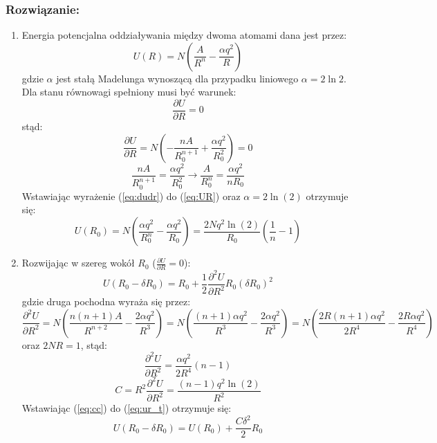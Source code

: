 \subsubsection*{Rozwiązanie:}
\begin{enumerate}
\item Energia potencjalna oddziaływania między dwoma atomami dana jest przez:
\begin{equation}
\label{eq:UR}
U(R) = N\left( \frac{A}{R^n} - \frac{\alpha q^2}{R} \right)
\end{equation}
gdzie $\alpha$ jest stałą Madelunga wynoszącą dla przypadku liniowego $\alpha = 2\ln 2$.\\
Dla stanu równowagi spełniony musi być warunek:
\begin{equation}
\frac{\partial U}{\partial R} = 0
\end{equation}
stąd:
\begin{equation}
\frac{\partial U}{\partial R} = N \left( -\frac{nA}{R_0^{n+1}} + \frac{\alpha q^2}{R_0^2} \right)= 0
\end{equation}
\begin{equation}
\label{eq:dudr}
\frac{nA}{R_0^{n+1}} = \frac{\alpha q^2}{R_0^2} \rightarrow \frac{A}{R_0^n} = \frac{\alpha q^2}{n R_0}
\end{equation}
Wstawiając wyrażenie (\ref{eq:dudr}) do (\ref{eq:UR}) oraz $\alpha=2\ln(2)$ otrzymuje się:
\begin{equation}
U(R_0) = N \left( \frac{\alpha q^2}{R_0^n} - \frac{\alpha q^2}{R_0} \right) = \frac{2Nq^2\ln(2)}{R_0} \left( \frac{1}{n} -1 \right)
\end{equation}
\hrulefill
\item Rozwijając w szereg wokół $R_0$ ($\frac{\partial U}{\partial R} =0 $):
\begin{equation}
\label{eq:ur_t}
U(R_0-\delta R_0 ) = R_0 + \frac{1}{2} \frac{\partial^2 U}{\partial R^2} R_0 (\delta R_0)^2
\end{equation}
gdzie druga pochodna wyraża się przez:
\begin{equation}
\frac{\partial^2 U}{\partial R^2} = N \left( \frac{n(n+1)A}{R^{n+2}} - \frac{2\alpha q^2}{R^3} \right) = N \left( \frac{(n+1)\alpha q^2}{R^3} - \frac{2\alpha q^2}{R^3} \right) = N \left( \frac{2R(n+1)\alpha q^2}{2R^4} - \frac{2R\alpha q^2}{R^4} \right)
\end{equation}
oraz $2NR=1$, stąd:
\begin{equation}
\frac{\partial^2 U}{\partial R^2} = \frac{\alpha q^2}{2R^4}(n-1)
\end{equation}
\begin{equation}
\label{eq:cc}
C = R^2 \frac{\partial^2 U}{\partial R^2} = \frac{(n-1)q^2\ln(2)}{R^2}
\end{equation}
Wstawiając (\ref{eq:cc}) do (\ref{eq:ur_t}) otrzymuje się:
\begin{equation}
U(R_0-\delta R_0 ) = U(R_0) + \frac{C\delta^2}{2}R_0 
\end{equation}
\end{enumerate}
